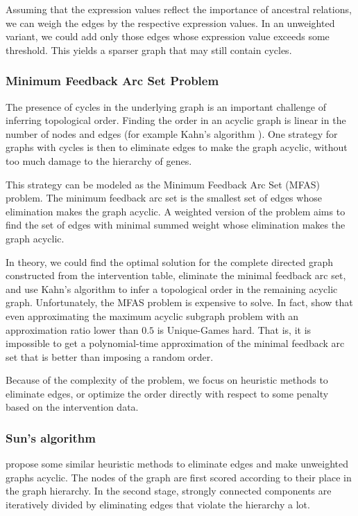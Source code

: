 Assuming that the expression values reflect the importance of ancestral relations, we can weigh the edges by the respective expression values. In an unweighted variant, we could add only those edges whose expression value exceeds some threshold. This yields a sparser graph that may still contain cycles.

\subsubsection*{Minimum Feedback Arc Set Problem}
The presence of cycles in the underlying graph is an important challenge of inferring topological order. Finding the order in an acyclic graph is linear in the number of nodes and edges (for example Kahn's algorithm ). One strategy for graphs with cycles is then to eliminate edges to make the graph acyclic, without too much damage to the hierarchy of genes.

This strategy can be modeled as the Minimum Feedback Arc Set (MFAS) problem. The minimum feedback arc set is the smallest set of edges whose elimination makes the graph acyclic. A weighted version of the problem aims to find the set of edges with minimal summed weight whose elimination makes the graph acyclic.

In theory, we could find the optimal solution for the complete directed graph constructed from the intervention table, eliminate the minimal feedback arc set, and use Kahn's algorithm to infer a topological order in the remaining acyclic graph. Unfortunately, the MFAS problem is expensive to solve. In fact, \citet{guruswami2008beating} show that even approximating the maximum acyclic subgraph problem with an approximation ratio lower than $0.5$ is Unique-Games hard. That is, it is impossible to get a polynomial-time approximation of the minimal feedback arc set that is better than imposing a random order.

Because of the complexity of the problem, we focus on heuristic methods to eliminate edges, or optimize the order directly with respect to some penalty based on the intervention data.

\subsubsection*{Sun's algorithm}
\citet{sun2017breaking} propose some similar heuristic methods to eliminate edges and make unweighted graphs acyclic. The nodes of the graph are first scored according to their place in the graph hierarchy. In the second stage, strongly connected components are iteratively divided by eliminating edges that violate the hierarchy a lot. 


